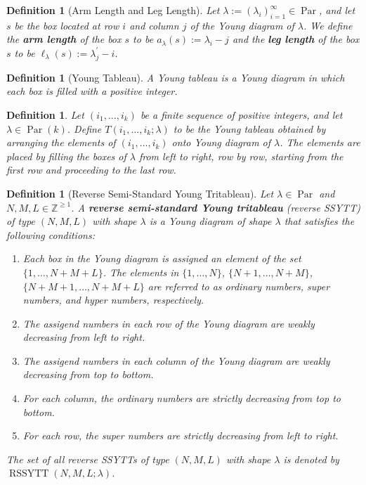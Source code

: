 \documentclass[12pt,reqno,a4paper]{amsart}
\newcommand{\bb}[1]{\mathbb{#1}}
\numberwithin{equation}{section}
\newtheorem{dfn}[thm]{Definition}
\theoremstyle{definition}
\begin{document}
\begin{dfn}[Arm Length and Leg Length]
Let $\lambda := (\lambda_i)_{i = 1}^{\infty} \in \operatorname{Par}$, and let $s$ be the box located at row $i$ and column $j$ of the Young diagram of $\lambda$. We define the \textbf{arm length} of the box $s$ to be $a_\lambda(s) := \lambda_i - j$ and the \textbf{leg length} of the box $s$ to be $\ell_\lambda(s) := \lambda^\prime_j - i$. 
\end{dfn}

\begin{dfn}[Young Tableau]
A Young tableau is a Young diagram in which each box is filled with a positive integer. 
\end{dfn}

\begin{dfn}
	Let $(i_1,\dots,i_k)$ be a finite sequence of positive integers, and let $\lambda \in \operatorname{Par}(k)$. Define 
	$T(i_1,\dots,i_k;\lambda)$ to be the Young tableau obtained by arranging the elements of $(i_1,\dots,i_k)$ onto Young diagram of $\lambda$. The elements are placed by filling the boxes of $\lambda$ from left to right, row by row, starting from the first row and proceeding to the last row. 
\end{dfn}

\begin{dfn}[Reverse Semi-Standard Young Tritableau]
\label{def35-1058-25jul}
Let $\lambda \in \operatorname{Par}$ and $N,M,L \in \bb{Z}^{\geq 1}$. A \textbf{reverse semi-standard Young tritableau} (reverse SSYTT) of type $(N,M,L)$ with shape $\lambda$ is a Young diagram of shape $\lambda$ that satisfies the following conditions:
\begin{enumerate}[(1)]
\item Each box in the Young diagram is assigned an element of the set $\{1,\dots,N+M+L\}$. 
The elements in $\{1,\dots,N\}$, $\{N+1,\dots,N+M\}$, $\{N+M+1,\dots,N+M+L\}$ are referred to as 
ordinary numbers, super numbers, and hyper numbers, respectively. 
\item The assigend numbers in each row of the Young diagram are weakly decreasing from left to right. 
\item The assigend numbers in each column of the Young diagram are weakly decreasing from top to bottom.  
\item For each column, the ordinary numbers are strictly decreasing from top to bottom.
\item For each row, the super numbers are strictly decreasing from left to right. 
\end{enumerate}
The set of all reverse SSYTTs of type $(N,M,L)$ with shape $\lambda$ is denoted by $\operatorname{RSSYTT}(N,M,L;\lambda)$. 
\end{dfn}
\end{document}
